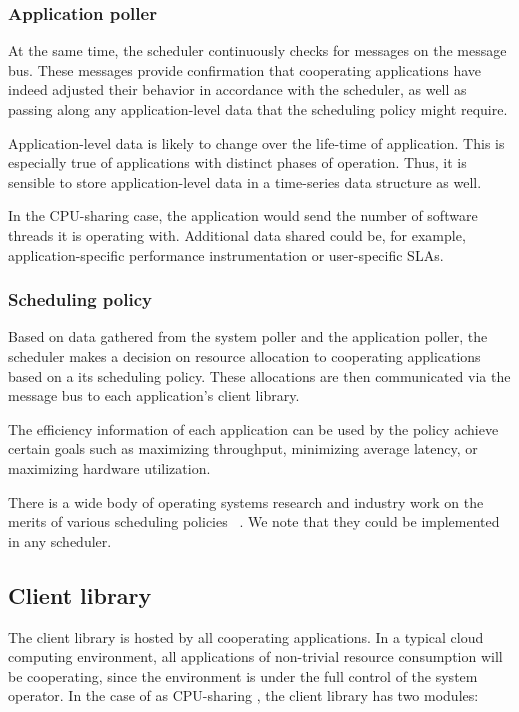 \subsubsection{Application poller}
At the same time, the scheduler continuously checks for messages on the message bus. These messages provide confirmation that cooperating applications have indeed adjusted their behavior in accordance with the scheduler, as well as passing along any application-level data that the scheduling policy might require. 

Application-level data is likely to change over the life-time of application. This is especially true of applications with distinct phases of operation. Thus, it is sensible to store application-level data in a time-series data structure as well.

In the CPU-sharing case, the application would send the number of software threads it is operating with. Additional data shared could be, for example, application-specific performance instrumentation or user-specific SLAs.

\subsubsection{Scheduling policy}
Based on data gathered from the system poller and the application poller, the scheduler makes a decision on resource allocation to cooperating applications based on a its scheduling policy. These allocations are then communicated via the message bus to each application's client library.

The efficiency information of each application can be used by the policy achieve certain goals such as maximizing throughput, minimizing average latency, or maximizing hardware utilization. 

There is a wide body of operating systems research and industry work on the merits of various scheduling policies ~\cite{li2009scheduler}. We note that they could be implemented in any \mech{} scheduler.

\subsection{Client library}
The client library is hosted by all cooperating applications. In a typical cloud computing environment, all applications of non-trivial resource consumption will be cooperating, since the environment is under the full control of the system operator.
In the case of as CPU-sharing \mech{}, the client library has two modules:


